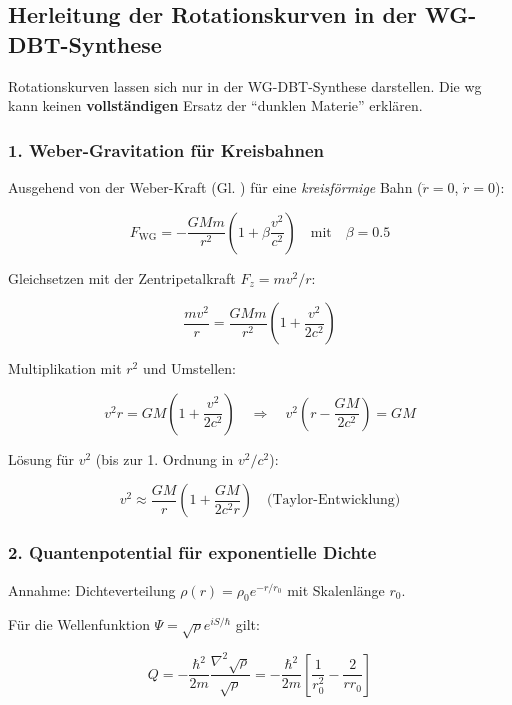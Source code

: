 \subsection{Herleitung der Rotationskurven in der WG-DBT-Synthese}
Rotationskurven lassen sich nur in der WG-DBT-Synthese darstellen. Die \gls{wg} kann keinen \textbf{vollständigen} Ersatz der \enquote{dunklen Materie} erklären.

\subsubsection{1. Weber-Gravitation für Kreisbahnen}
Ausgehend von der Weber-Kraft (Gl. ) für eine \textit{kreisförmige} Bahn ($\ddot{r} = 0$, $\dot{r} = 0$):

\begin{equation}
F_{\text{WG}} = -\frac{GMm}{r^2}\left(1 + \beta\frac{v^2}{c^2}\right) \quad \text{mit} \quad \beta = 0.5
\end{equation}

Gleichsetzen mit der Zentripetalkraft $F_z = mv^2/r$:

\begin{equation}
\frac{mv^2}{r} = \frac{GMm}{r^2}\left(1 + \frac{v^2}{2c^2}\right)
\end{equation}

Multiplikation mit $r^2$ und Umstellen:

\begin{equation}
v^2r = GM\left(1 + \frac{v^2}{2c^2}\right) \quad \Rightarrow \quad v^2\left(r - \frac{GM}{2c^2}\right) = GM
\end{equation}

Lösung für $v^2$ (bis zur 1. Ordnung in $v^2/c^2$):

\begin{equation}
v^2 \approx \frac{GM}{r}\left(1 + \frac{GM}{2c^2r}\right) \quad \text{(Taylor-Entwicklung)}
\end{equation}

\subsubsection{2. Quantenpotential für exponentielle Dichte}
Annahme: Dichteverteilung $\rho(r) = \rho_0 e^{-r/r_0}$ mit Skalenlänge $r_0$.

Für die Wellenfunktion $\Psi = \sqrt{\rho} e^{iS/\hbar}$ gilt:

\begin{equation}
Q = -\frac{\hbar^2}{2m}\frac{\nabla^2\sqrt{\rho}}{\sqrt{\rho}} = -\frac{\hbar^2}{2m}\left[\frac{1}{r_0^2} - \frac{2}{rr_0}\right]
\end{equation}

